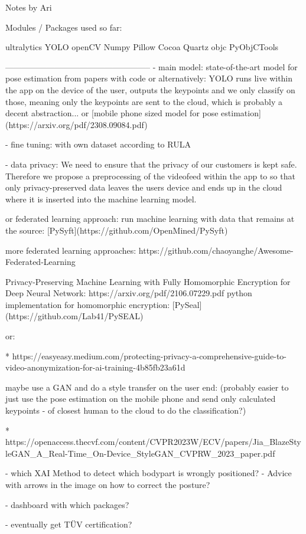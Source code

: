 
Notes by Ari

Modules / Packages used so far: 

ultralytics YOLO
openCV
Numpy
Pillow
Cocoa
Quartz
objc
PyObjCTools

-----------------------------------------------------
- main model:
state-of-the-art model for pose estimation from papers with code
or alternatively:
YOLO runs live within the app on the device of the user, outputs the keypoints 
and we only classify on those, meaning only the keypoints are sent to the cloud, 
which is probably a decent abstraction...
or
[mobile phone sized model for pose estimation](https://arxiv.org/pdf/2308.09084.pdf)

- fine tuning:
with own dataset according to RULA

- data privacy:
We need to ensure that the privacy of our customers is kept safe.
Therefore we propose a preprocessing of the videofeed within the app 
to so that only privacy-preserved data leaves the users device 
and ends up in the cloud where it is inserted into the machine learning model.

or federated learning approach:
run machine learning with data that remains at the source:
[PySyft](https://github.com/OpenMined/PySyft)

more federated learning approaches:
https://github.com/chaoyanghe/Awesome-Federated-Learning

Privacy-Preserving Machine Learning with Fully Homomorphic Encryption for Deep Neural Network:
https://arxiv.org/pdf/2106.07229.pdf
python implementation for homomorphic encryption: [PySeal](https://github.com/Lab41/PySEAL)

or:

* https://easyeasy.medium.com/protecting-privacy-a-comprehensive-guide-to-video-anonymization-for-ai-training-4b85fb23a61d

maybe use a GAN and do a style transfer on the user end:
(probably easier to just use the pose estimation on the mobile phone 
and send only calculated keypoints - of closest human to the cloud to do the classification?)

* https://openaccess.thecvf.com/content/CVPR2023W/ECV/papers/Jia_BlazeStyleGAN_A_Real-Time_On-Device_StyleGAN_CVPRW_2023_paper.pdf


- which XAI Method to detect which bodypart is wrongly positioned?
- Advice with arrows in the image on how to correct the posture?

- dashboard with which packages?

- eventually get TÜV certification?
